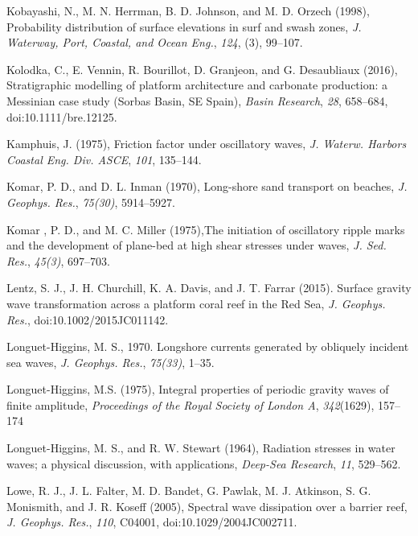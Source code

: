 \documentclass[default,jgrga]{agutex2015}
\begin{document}
\begin{article}
\begin{thebibliography}{}
Kobayashi, N., M. N. Herrman, B. D. Johnson, and M. D. Orzech (1998), Probability distribution of surface elevations in surf and swash zones, \textit{J. Waterway, Port, Coastal, and Ocean Eng.}, \textit{124}, (3), 99--107.

Kolodka, C., E. Vennin, R. Bourillot, D. Granjeon, and G. Desaubliaux (2016), Stratigraphic modelling of platform architecture and carbonate production: a Messinian case study (Sorbas Basin, SE Spain), \textit{Basin Research}, \textit{28}, 658--684, doi:10.1111/bre.12125.

Kamphuis, J. (1975), Friction factor under oscillatory waves, \textit{J. Waterw. Harbors Coastal Eng. Div. ASCE}, \textit{101}, 135--144.

Komar, P. D., and D. L. Inman (1970), Long-shore sand transport on beaches, \textit{J. Geophys. Res.}, \textit{75(30)}, 5914--5927.

Komar , P. D., and M. C. Miller (1975),The initiation of oscillatory ripple marks and the development of plane-bed at high shear stresses under waves, \textit{J. Sed. Res.}, \textit{45(3)}, 697--703.

Lentz, S. J., J. H. Churchill, K. A. Davis, and J. T. Farrar (2015). Surface gravity wave transformation across a platform coral reef in the Red Sea, \textit{J. Geophys. Res.}, doi:10.1002/2015JC011142.

Longuet-Higgins, M. S., 1970. Longshore currents generated by obliquely incident sea waves, \textit{J. Geophys. Res.}, \textit{75(33)}, 1--35.

Longuet-Higgins, M.S. (1975), Integral properties of periodic gravity waves of finite amplitude, \textit{Proceedings of the Royal Society of London A}, \textit{342}(1629), 157--174

Longuet-Higgins, M. S., and R. W. Stewart (1964), Radiation stresses in water waves; a physical discussion, with applications, \textit{Deep-Sea Research}, \textit{11}, 529--562.

Lowe, R. J., J. L. Falter, M. D. Bandet, G. Pawlak, M. J. Atkinson, S. G. Monismith, and J. R. Koseff (2005), Spectral wave dissipation over a barrier reef, \textit{J. Geophys. Res.}, \textit{110}, C04001, doi:10.1029/2004JC002711.


\end{thebibliography}
\end{article}
\end{document}

